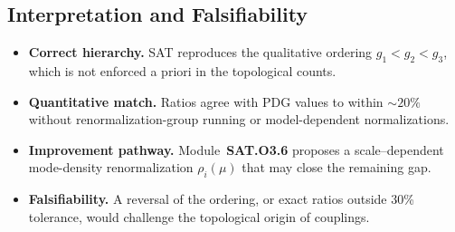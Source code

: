 \subsection{Interpretation and Falsifiability}

\begin{itemize}
\item \textbf{Correct hierarchy.} SAT reproduces the qualitative ordering
$g_1 < g_2 < g_3$, which is not enforced a priori in the topological counts.
\item \textbf{Quantitative match.} Ratios agree with PDG values to within
$\sim 20\%$ without renormalization-group running or model-dependent
normalizations.
\item \textbf{Improvement pathway.} Module~\textbf{SAT.O3.6} proposes a
scale--dependent mode-density renormalization $\rho_i(\mu)$ that may close
the remaining gap.
\item \textbf{Falsifiability.} A reversal of the ordering, or exact ratios
outside 30\% tolerance, would challenge the topological origin of couplings.
\end{itemize}

